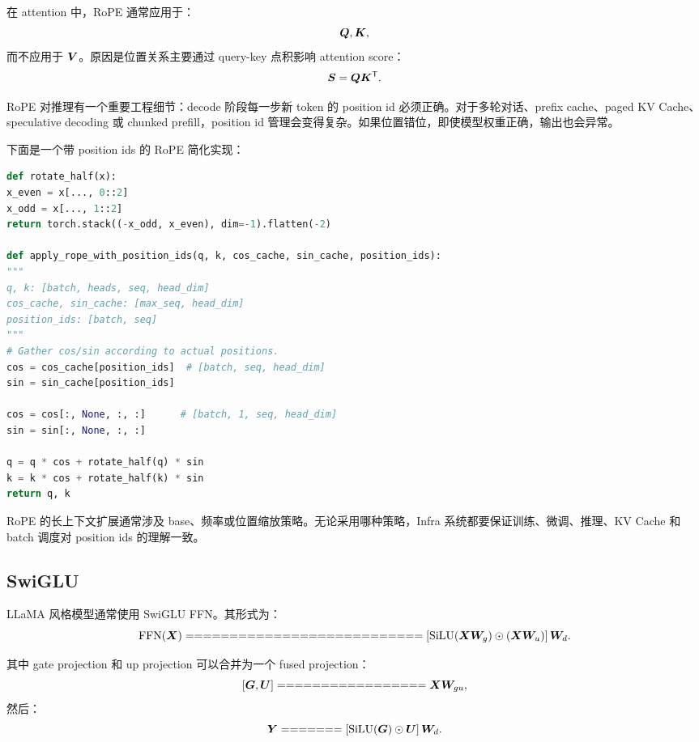 在 attention 中，RoPE 通常应用于：
\[
\bm{Q},\bm{K},
\]
而不应用于 $\bm{V}$。原因是位置关系主要通过 query-key 点积影响 attention score：
\[
\bm{S}=\bm{Q}\bm{K}^{\mathsf{T}}.
\]

RoPE 对推理有一个重要工程细节：decode 阶段每一步新 token 的 position id 必须正确。对于多轮对话、prefix cache、paged KV Cache、speculative decoding 或 chunked prefill，position id 管理会变得复杂。如果位置错位，即使模型权重正确，输出也会异常。

下面是一个带 position ids 的 RoPE 简化实现：

\begin{lstlisting}[language=Python,caption={带 position ids 的 RoPE 应用示意},label={lst:rope-with-position-ids}]
def rotate_half(x):
x_even = x[..., 0::2]
x_odd = x[..., 1::2]
return torch.stack((-x_odd, x_even), dim=-1).flatten(-2)

def apply_rope_with_position_ids(q, k, cos_cache, sin_cache, position_ids):
"""
q, k: [batch, heads, seq, head_dim]
cos_cache, sin_cache: [max_seq, head_dim]
position_ids: [batch, seq]
"""
# Gather cos/sin according to actual positions.
cos = cos_cache[position_ids]  # [batch, seq, head_dim]
sin = sin_cache[position_ids]

cos = cos[:, None, :, :]      # [batch, 1, seq, head_dim]
sin = sin[:, None, :, :]

q = q * cos + rotate_half(q) * sin
k = k * cos + rotate_half(k) * sin
return q, k

\end{lstlisting}

RoPE 的长上下文扩展通常涉及 base、频率或位置缩放策略。无论采用哪种策略，Infra 系统都要保证训练、微调、推理、KV Cache 和 batch 调度对 position ids 的理解一致。

\subsection{SwiGLU}
\label{subsec:llama-swiglu}

LLaMA 风格模型通常使用 SwiGLU FFN。其形式为：
\[
\operatorname{FFN}(\mat{X})
===========================

\left[
\operatorname{SiLU}(\mat{X}\mat{W}_g)
\odot
(\mat{X}\mat{W}_u)
\right]\mat{W}_d.
\]

其中 gate projection 和 up projection 可以合并为一个 fused projection：
\[
[\mat{G},\mat{U}]
=================

\mat{X}\mat{W}_{gu},
\]
然后：
\[
\mat{Y}
=======

\left[
\operatorname{SiLU}(\mat{G})
\odot
\mat{U}
\right]\mat{W}_d.
\]

